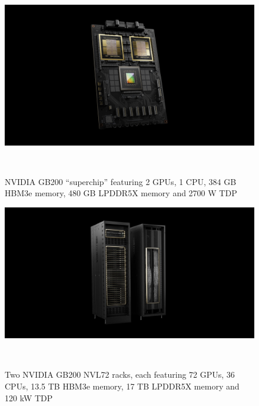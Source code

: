 \documentclass[aspectratio=169]{beamer}
\begin{document}
    \begin{frame}
        \begin{figure}
            \includegraphics[height=0.5\textwidth]{images/gb200-superchip}
            \caption{NVIDIA GB200 ``superchip'' featuring 2 GPUs, 1 CPU, 384 GB HBM3e memory, 480 GB LPDDR5X memory and 2700 W TDP}~\parencite{nvidia_gb200_nvl72_2025}
        \end{figure}
    \end{frame}
    \begin{frame}
        \begin{figure}
            \includegraphics[height=0.5\textwidth]{images/gb-nvl72-og}
            \caption{Two NVIDIA GB200 NVL72 racks, each featuring 72 GPUs, 36 CPUs, 13.5 TB HBM3e memory, 17 TB LPDDR5X memory and 120 kW TDP}~\parencite{nvidia_gb200_nvl72_2025}
        \end{figure}
    \end{frame}
\end{document}
